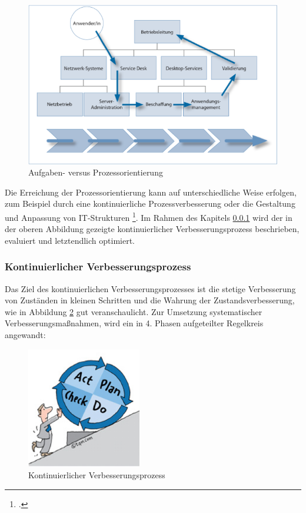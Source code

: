 \begin{figure}[h!]
	\centering
	\includegraphics[width=15cm]{kapitel/gruppe1_2/bilder/aufgaben-versus_prozessorientierung} 
	\caption{Aufgaben- versus Prozessorientierung\protect\footnotemark}
	\label{fig_aufgaben_vs_prozess}
\end{figure}

Die Erreichung der Prozessorientierung kann auf unterschiedliche Weise erfolgen, zum Beispiel durch eine kontinuierliche Prozessverbesserung oder die Gestaltung und Anpassung von IT-Strukturen \footcite[Vgl.][45]{wissensmanagement_2010}. Im Rahmen des Kapitels \ref{subsubsection_kontinuierlicher_verbesserungsprozess}  wird der in der oberen Abbildung gezeigte kontinuierlicher Verbesserungsprozess beschrieben, evaluiert und letztendlich optimiert.


\subsubsection{Kontinuierlicher Verbesserungsprozess}
\label{subsubsection_kontinuierlicher_verbesserungsprozess}
Das Ziel des kontinuierlichen Verbesserungsprozesses ist die stetige Verbesserung von Zuständen in kleinen Schritten und die Wahrung der  Zustandsverbesserung, wie in Abbildung \ref{fig_kontinuierliche_verbesserung} gut veranschaulicht. Zur Umsetzung systematischer Verbesserungsmaßnahmen, wird ein in 4. Phasen aufgeteilter Regelkreis angewandt:

\begin{figure}[h!]
	\centering
	\includegraphics[width=5cm]{kapitel/gruppe1_2/bilder/kontinuierlicher_verbesserungsprozess} 
	\caption{Kontinuierlicher Verbesserungsprozess\protect\footnotemark}
	\label{fig_kontinuierliche_verbesserung}
\end{figure}


